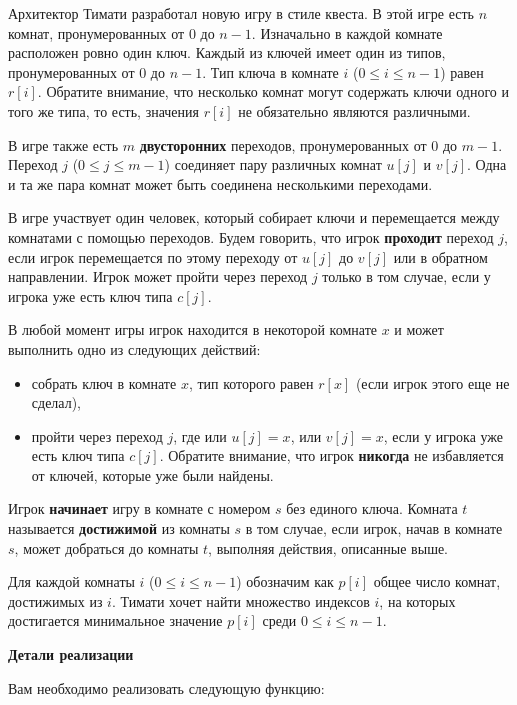 Архитектор Тимати разработал новую игру в стиле квеста. В этой игре есть $n$ комнат, пронумерованных от $0$ до $n-1$. Изначально в каждой комнате расположен ровно один ключ. Каждый из ключей имеет один из типов, пронумерованных от $0$ до $n-1$. Тип ключа в комнате $i$ ($0 \leq i \leq n-1$) равен $r[i]$. Обратите внимание, что несколько комнат могут содержать ключи одного и того же типа, то есть, значения $r[i]$ не обязательно являются различными.

В игре также есть $m$ \textbf{двусторонних} переходов, пронумерованных от $0$ до $m-1$.
Переход $j$ ($0 \leq j \leq m-1$) соединяет пару различных комнат $u[j]$ и $v[j]$.
Одна и та же пара комнат может быть соединена несколькими переходами.

В игре участвует один человек, который собирает ключи и перемещается между комнатами с помощью переходов. Будем говорить, что игрок \textbf{проходит} переход $j$, если игрок перемещается по этому переходу от $u[j]$ до $v[j]$ или в обратном направлении. Игрок может пройти через переход $j$ только в том случае, если у игрока уже есть ключ типа $c[j]$.

В любой момент игры игрок находится в некоторой комнате $x$ и может выполнить одно из следующих действий:
\begin{itemize}
\item собрать ключ в комнате $x$, тип которого равен $r[x]$ (если игрок этого еще не сделал),
\item пройти через переход $j$, где или $u[j]=x$, или $v[j]=x$, если у игрока уже есть ключ типа $c[j]$. Обратите внимание, что игрок \textbf{никогда} не избавляется от ключей, которые уже были найдены.
\end{itemize}

Игрок \textbf{начинает} игру в комнате с номером $s$ без единого ключа.
Комната $t$ называется \textbf{достижимой} из комнаты $s$ в том случае, если игрок, начав в комнате $s$, может добраться до комнаты $t$, выполняя действия, описанные выше.

Для каждой комнаты $i$ ($0 \leq i \leq n-1$) обозначим как $p[i]$ общее число комнат, достижимых из $i$. Тимати хочет найти множество индексов $i$, на которых достигается минимальное значение $p[i]$ среди $0 \leq i \leq n-1$.

\textbf{Детали реализации}

Вам необходимо реализовать следующую функцию:

